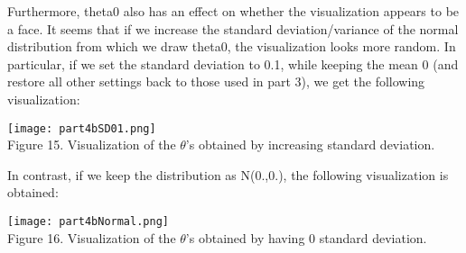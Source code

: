 \documentclass{article}
\begin{document}
\par Furthermore, theta0 also has an effect on whether the visualization appears to be a face. It seems that if we increase the standard deviation/variance of the normal distribution from which we draw theta0, the visualization looks more random. In particular, if we set the standard deviation to 0.1, while keeping the mean 0 (and restore all other settings back to those used in part 3), we get the following visualization: 
\begin{center}
\texttt{[image: part4bSD01.png]}\\
Figure 15. Visualization of the $\theta$'s obtained by increasing standard deviation. 
\end{center}
In contrast, if we keep the distribution as N(0.,0.), the following visualization is obtained:
\begin{center}
\texttt{[image: part4bNormal.png]}\\
Figure 16. Visualization of the $\theta$'s obtained by having 0 standard deviation. 
\end{center}



\newpage
\end{document}
